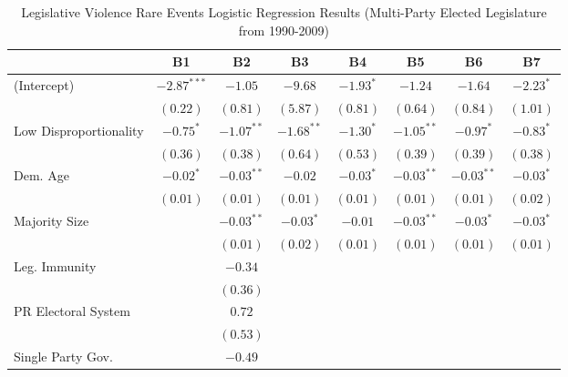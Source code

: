 \documentclass[a4paper]{article}\usepackage[]{graphicx}\usepackage[]{color}
\begin{document}
\begin{table}
\caption{Legislative Violence Rare Events Logistic Regression Results (Multi-Party Elected Legislature from 1990-2009)}
\label{outputTable.1990}
\begin{center}

\begin{tabular}{l c c c c c c c }
\hline
                        & B1 & B2 & B3 & B4 & B5 & B6 & B7 \\
\hline
(Intercept)             & $-2.87^{***}$ & $-1.05$      & $-9.68$      & $-1.93^{*}$ & $-1.24$      & $-1.64$      & $-2.23^{*}$ \\
                        & $(0.22)$      & $(0.81)$     & $(5.87)$     & $(0.81)$    & $(0.64)$     & $(0.84)$     & $(1.01)$    \\
Low Disproportionality  & $-0.75^{*}$   & $-1.07^{**}$ & $-1.68^{**}$ & $-1.30^{*}$ & $-1.05^{**}$ & $-0.97^{*}$  & $-0.83^{*}$ \\
                        & $(0.36)$      & $(0.38)$     & $(0.64)$     & $(0.53)$    & $(0.39)$     & $(0.39)$     & $(0.38)$    \\
Dem. Age                & $-0.02^{*}$   & $-0.03^{**}$ & $-0.02$      & $-0.03^{*}$ & $-0.03^{**}$ & $-0.03^{**}$ & $-0.03^{*}$ \\
                        & $(0.01)$      & $(0.01)$     & $(0.01)$     & $(0.01)$    & $(0.01)$     & $(0.01)$     & $(0.02)$    \\
Majority Size           &               & $-0.03^{**}$ & $-0.03^{*}$  & $-0.01$     & $-0.03^{**}$ & $-0.03^{*}$  & $-0.03^{*}$ \\
                        &               & $(0.01)$     & $(0.02)$     & $(0.01)$    & $(0.01)$     & $(0.01)$     & $(0.01)$    \\
Leg. Immunity           &               & $-0.34$      &              &             &              &              &             \\
                        &               & $(0.36)$     &              &             &              &              &             \\
PR Electoral System     &               & $0.72$       &              &             &              &              &             \\
                        &               & $(0.53)$     &              &             &              &              &             \\
Single Party Gov.       &               & $-0.49$      &              &             &              &              &             \\

\end{tabular}
\end{center}
\end{table}
\end{document}
